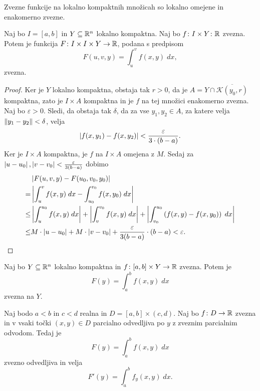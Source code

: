 \begin{opomba}
Zvezne funkcije na lokalno kompaktnih množicah so lokalno omejene in enakomerno zvezne.
\end{opomba}

\begin{izrek}
Naj bo $I = [a,b]$ in $Y \subseteq \mathbb{R}^n$ lokalno kompaktna. Naj bo
$f \colon I \times Y \colon \mathbb{R}$ zvezna. Potem je funkcija
$F \colon I \times I \times Y \to \mathbb{R}$, podana s predpisom
\[
F(u,v,y) = \int_u^v f(x,y)\;dx,
\]
zvezna.
\end{izrek}

\begin{proof}
Ker je $Y$ lokalno kompaktna, obstaja tak $r>0$, da je
$A = Y \cap \overline{\mathcal{K}(y_0,r)}$ kompaktna, zato je
$I \times A$ kompaktna in je $f$ na tej množici enakomerno zvezna.
Naj bo $\varepsilon > 0$. Sledi, da obstaja tak $\delta$, da za vse
$y_1,y_2 \in A$, za katere velja $\left\lVert y_1 - y_2\right\rVert < \delta$, velja
\[
\left\lvert f(x,y_1) - f(x,y_2)\right\rvert < \frac{\varepsilon}{3 \cdot (b-a)}.
\]
Ker je $I \times A$ kompaktna, je $f$ na $I \times A$ omejena z
$M$. Sedaj za
$\left\lvert u-u_0\right\rvert,\left\lvert v-v_0\right\rvert < \frac{\varepsilon}{3(b-a)}$ dobimo
\begin{align*}
&\left\lvert F(u,v,y) - F(u_0,v_0,y_0)\right\rvert
\\
= &\left\lvert \int_u^v f(x,y)\;dx - \int_{u_0}^{v_0} f(x,y_0)\;dx\right\rvert
\\
\leq &\left\lvert \int_u^{u_0} f(x,y)\;dx\right\rvert +
\left\lvert \int_v^{v_0} f(x,y)\;dx\right\rvert +
\left\lvert \int_{v_0}^{u_0} \left(f(x,y) - f(x,y_0)\right)\;dx\right\rvert
\\
\leq &M \cdot \left\lvert u-u_0\right\rvert + M \cdot \left\lvert v-v_0\right\rvert +
\frac{\varepsilon}{3(b-a)} \cdot (b-a) < \varepsilon. \qedhere
\end{align*}
\end{proof}

\begin{posledica}
Naj bo $Y \subseteq \mathbb{R}^n$ lokalno kompaktna in
$f \colon [a,b] \times Y \to \mathbb{R}$ zvezna. Potem je
\[
F(y) = \int_a^b f(x,y)\;dx
\]
zvezna na $Y$.
\end{posledica}

\begin{izrek}
Naj bodo $a<b$ in $c<d$ realna in $D = [a,b] \times (c,d)$. Naj bo
$f \colon D \to \mathbb{R}$ zvezna in v vsaki točki $(x,y) \in D$ parcialno
odvedljiva po $y$ z zveznim parcialnim odvodom. Tedaj je
\[
F(y) = \int_a^b f(x,y)\;dx
\]
zvezno odvedljiva in velja
\[
F'(y) = \int_a^b f_y(x,y)\;dx.
\]
\end{izrek}

